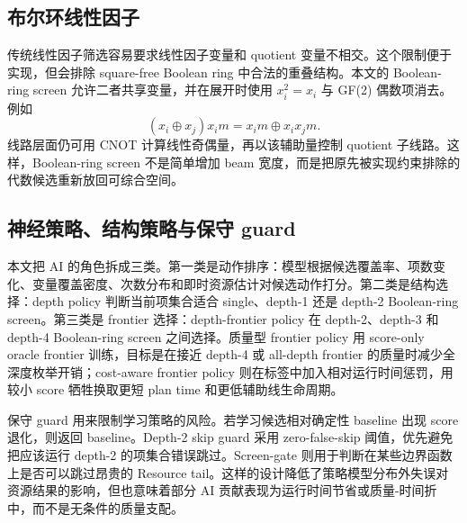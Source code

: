 \documentclass[UTF8,fontset=macnew,11pt]{ctexart}
\newcommand{\screen}{Boolean-ring screen}
\newcommand{\xor}{\ensuremath{\oplus}}
\begin{document}
\subsection{布尔环线性因子}

传统线性因子筛选容易要求线性因子变量和 quotient 变量不相交。这个限制便于实现，但会排除 square-free Boolean ring 中合法的重叠结构。本文的 \screen{} 允许二者共享变量，并在展开时使用 $x_i^2=x_i$ 与 GF(2) 偶数项消去。例如
\begin{equation}
  (x_i\xor x_j)x_i m = x_i m \xor x_i x_j m .
  \label{eq:boolean-ring}
\end{equation}
线路层面仍可用 CNOT 计算线性奇偶量，再以该辅助量控制 quotient 子线路。这样，\screen{} 不是简单增加 beam 宽度，而是把原先被实现约束排除的代数候选重新放回可综合空间。

\subsection{神经策略、结构策略与保守 guard}

本文把 AI 的角色拆成三类。第一类是动作排序：模型根据候选覆盖率、项数变化、变量覆盖密度、次数分布和即时资源估计对候选动作打分。第二类是结构选择：depth policy 判断当前项集合适合 single、depth-1 还是 depth-2 \screen{}。第三类是 frontier 选择：depth-frontier policy 在 depth-2、depth-3 和 depth-4 \screen{} 之间选择。质量型 frontier policy 用 score-only oracle frontier 训练，目标是在接近 depth-4 或 all-depth frontier 的质量时减少全深度枚举开销；cost-aware frontier policy 则在标签中加入相对运行时间惩罚，用较小 score 牺牲换取更短 plan time 和更低辅助线生命周期。

保守 guard 用来限制学习策略的风险。若学习候选相对确定性 baseline 出现 score 退化，则返回 baseline。Depth-2 skip guard 采用 zero-false-skip 阈值，优先避免把应该运行 depth-2 的项集合错误跳过。Screen-gate 则用于判断在某些边界函数上是否可以跳过昂贵的 Resource tail。这样的设计降低了策略模型分布外失误对资源结果的影响，但也意味着部分 AI 贡献表现为运行时间节省或质量-时间折中，而不是无条件的质量支配。
\end{document}
